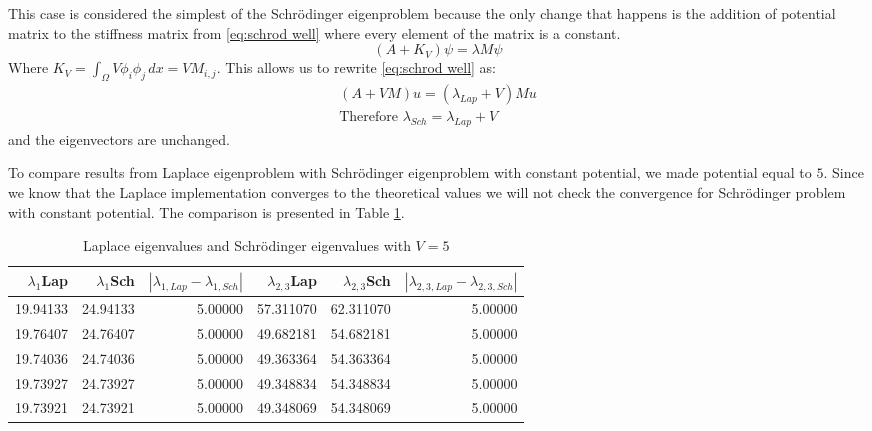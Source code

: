 \documentclass[acmsmall,screen]{MapleTrans}
\begin{document}
This case is considered the simplest of the Schr\"{o}dinger eigenproblem because the only change that happens is the addition of potential matrix to the stiffness matrix from \eqref{eq:schrod well} where every element of the matrix is a constant.
\begin{equation}
    (A + K_V)\psi = \lambda M\psi
    \label{eq:schrod well}
\end{equation}
Where $K_V = \int_\Omega V\phi_i\phi_j \, dx = VM_{i,j}$. This allows us to rewrite \eqref{eq:schrod well} as:
\begin{equation}
\begin{aligned}
    (A + VM)u = (\lambda_{Lap} + V)Mu \\
    \text{Therefore } \lambda_{Sch} = \lambda_{Lap} + V
\end{aligned}
\end{equation}
and the eigenvectors are unchanged.

To compare results from Laplace eigenproblem with Schr\"{o}dinger eigenproblem with constant potential, we made potential equal to $5$. Since we know that the Laplace implementation converges to the theoretical values we will not check the convergence for Schr\"{o}dinger problem with constant potential.
The comparison is presented in Table \ref{tab:Laplace vs Schrod}.
\begin{table}[H]
    \centering
    \caption{Laplace eigenvalues and Schr\"{o}dinger eigenvalues with $V=5$}
    \label{tab:Laplace vs Schrod}
    \begin{tabular}{rrrrrr}
        \toprule
        $\lambda_1$Lap & $\lambda_1$Sch & $|\lambda_{1,Lap} - \lambda_{1,Sch}|$ & $\lambda_{2,3}$Lap & $\lambda_{2,3}$Sch & $|\lambda_{2,3,Lap} - \lambda_{2,3,Sch}|$ \\
        \midrule
        19.94133 & 24.94133 & 5.00000 & 57.311070 & 62.311070 & 5.00000 \\
        19.76407 & 24.76407 & 5.00000 & 49.682181 & 54.682181 & 5.00000 \\
        19.74036 & 24.74036 & 5.00000 & 49.363364 & 54.363364 & 5.00000 \\
        19.73927 & 24.73927 & 5.00000 & 49.348834 & 54.348834 & 5.00000 \\
        19.73921 & 24.73921 & 5.00000 & 49.348069 & 54.348069 & 5.00000 \\

        \bottomrule
    \end{tabular}
\end{table}
\end{document}
